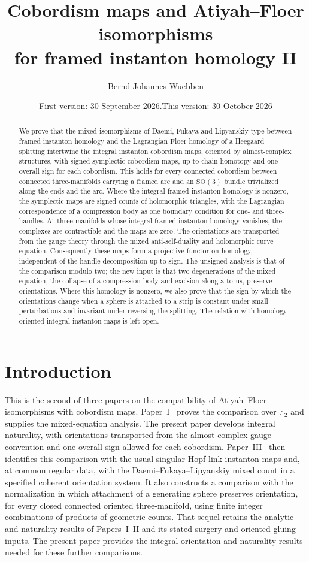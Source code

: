 \documentclass[11pt]{amsart}
\title[Atiyah--Floer cobordism maps II]{Cobordism maps and Atiyah--Floer isomorphisms\\
for framed instanton homology II}
\author{Bernd Johannes Wuebben}
\date{First version: 30 September 2026.\newline This version: 30 October 2026}
\theoremstyle{definition}
\theoremstyle{remark}
\theoremstyle{plain}
\numberwithin{equation}{section}
\newcommand{\FF}{\mathbb F_2}
\newcommand{\SO}{\mathrm{SO}}
\begin{document}
\begin{abstract}
We prove that the mixed isomorphisms of Daemi, Fukaya and Lipyanskiy type between framed
instanton homology and the Lagrangian Floer homology of a Heegaard splitting intertwine the
integral instanton cobordism maps, oriented by almost-complex structures, with signed symplectic
cobordism maps, up to chain homotopy and one overall sign for each cobordism. This holds for
every connected cobordism between connected three-manifolds carrying a framed arc and an $\SO(3)$
bundle trivialized along the ends and the arc. Where the integral framed instanton homology is nonzero, the
symplectic maps are signed counts of holomorphic triangles, with the Lagrangian correspondence of
a compression body as one boundary condition for one- and three-handles. At three-manifolds whose integral framed instanton homology vanishes, the complexes are contractible and the maps are zero. The orientations are transported from the gauge theory through the mixed
anti-self-duality and holomorphic curve equation. Consequently these maps form a projective
functor on homology, independent of the handle decomposition up to sign. The unsigned analysis is that of the comparison modulo two; the new input is that two degenerations of the mixed
equation, the collapse of a compression body and excision along a torus, preserve orientations.
Where this homology is nonzero, we also prove that the sign by which the orientations change when a sphere is attached to a strip is constant
under small perturbations and invariant under reversing the splitting. The relation with
homology-oriented integral instanton maps is left open.
\end{abstract}
\maketitle
\setcounter{tocdepth}{1}

\newpage
\tableofcontents
\newpage

\section{Introduction}\label{sec:introduction}

This is the second of three papers on the compatibility of Atiyah--Floer
isomorphisms with cobordism maps. Paper~I~\cite{PaperI} proves the
comparison over $\FF$ and supplies the mixed-equation analysis. The
present paper develops integral naturality, with orientations transported
from the almost-complex gauge convention and one overall sign allowed
for each cobordism. Paper~III~\cite{PaperIII} then identifies this
comparison with the usual singular Hopf-link instanton maps and, at
common regular data, with the Daemi--Fukaya--Lipyanskiy mixed count in
a specified coherent orientation system. It also constructs a comparison
with the normalization in which attachment of a generating sphere
preserves orientation, for every closed connected oriented
three-manifold, using finite integer combinations of products of
geometric counts. That sequel retains the analytic and naturality
results of Papers~I--II and its stated surgery and oriented gluing
inputs. The present paper provides the integral orientation and
naturality results needed for these further comparisons.
\end{document}
